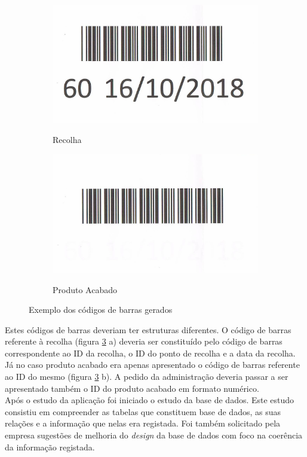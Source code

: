 \begin{figure}[H]
	\centering
	
	\begin{subfigure}[t]{0.4\linewidth}
		\includegraphics[width=\linewidth]{figuras/AppAccess/2-CodBarras.jpg}
		\label{fig:app_access_cb_recolha}
		\caption{Recolha}
	\end{subfigure}
	\begin{subfigure}[t]{0.4\linewidth}
		\includegraphics[width=\linewidth]{figuras/AppAccess/5-CodBarras.jpg}
		\label{fig:app_access_cb_prod_acabado}
		\caption{Produto Acabado}
	\end{subfigure}
	
	\caption{Exemplo dos códigos de barras gerados}
	\label{fig:app_access_cb}
\end{figure}
\noindent
Estes códigos de barras deveriam ter estruturas diferentes. O código de barras referente à recolha (figura \ref{fig:app_access_cb} a) deveria ser constituído pelo código de barras correspondente ao ID da recolha, o ID do ponto de recolha e a data da recolha. Já no caso produto acabado era apenas apresentado o código de barras referente ao ID do mesmo (figura \ref{fig:app_access_cb} b). A pedido da administração deveria passar a ser apresentado também o ID do produto acabado em formato numérico.\\
Após o estudo da aplicação foi iniciado o estudo da base de dados. Este estudo consistiu em compreender as tabelas que constituem base de dados, as suas relações e a informação que nelas era registada. Foi também solicitado pela empresa sugestões de melhoria do \textit{design} da base de dados com foco na coerência da informação registada.

